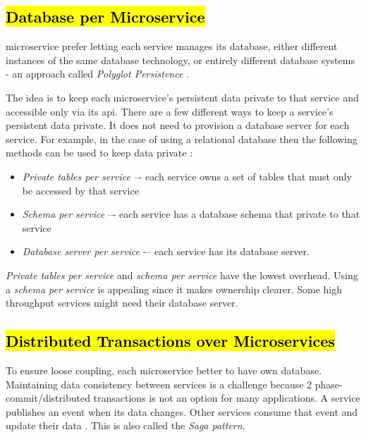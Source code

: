 \subsection{\hl{Database per Microservice}}
\label{subse:database_per_service}

\acrshort{microservice} prefer letting each service manages its database, either different instances of the same database technology, or entirely different database systems - an approach called \emph{Polyglot Persistence} \cite{LewisMicroservicesManagement}.

The idea is to keep each microservice’s persistent data private to that service and accessible only via its \acrshort{api}. 
There are a few different ways to keep a service's persistent data private.  It does not need to provision a database server for each service. For example, in the case of using a relational database then the following methods can be used to keep data private \cite{RichardsonMicroservicesService}:
\begin{itemize}
    \item \emph{Private tables per service} –- each service owns a set of tables that must only be accessed by that service
    \item \emph{Schema per service} –- each service has a database schema that private to that service
    \item \emph{Database server per service} -– each service has its database server.
\end{itemize}
\emph{Private tables per service} and \emph{schema per service} have the lowest overhead. Using a \emph{schema per service} is appealing since it makes ownership clearer. Some high throughput services might need their database server.

\subsection{\hl{Distributed Transactions over Microservices}}
\label{subse:sagas}
To ensure loose coupling, each microservice better to have own database. Maintaining data consistency between services is a challenge because 2 phase-commit/distributed transactions is not an option for many applications. A service publishes an event when its data changes. Other services consume that event and update their data \cite{RichardsonMicroservicesSagas}. This is also called the \emph{Saga pattern}.

